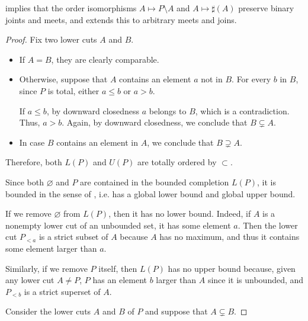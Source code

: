 \begin{comments}
  \item {} implies that the order isomorphisms \( A \mapsto P \setminus A \) and \( A \mapsto \sharp(A) \) preserve binary joints and meets, and  extends this to arbitrary meets and joins.
\end{comments}
\begin{proof}
   Fix two lower cuts \( A \) and \( B \).

  \begin{itemize}
    \item If \( A = B \), they are clearly comparable.
    \item Otherwise, suppose that \( A \) contains an element \( a \) not in \( B \). For every \( b \) in \( B \), since \( P \) is total, either \( a \leq b \) or \( a > b \).

    If \( a \leq b \), by downward closedness \( a \) belongs to \( B \), which is a contradiction. Thus, \( a > b \). Again, by downward closedness, we conclude that \( B \subsetneq A \).

    \item In case \( B \) contains an element in \( A \), we conclude that \( B \supsetneq A \).
  \end{itemize}

  Therefore, both \( L(P) \) and \( U(P) \) are totally ordered by \( {\subset} \).

   Since both \( \varnothing \) and \( P \) are contained in the bounded completion \( L(P) \), it is bounded in the sense of , i.e. has a global lower bound and global upper bound.

  If we remove \( \varnothing \) from \( L(P) \), then it has no lower bound. Indeed, if \( A \) is a nonempty lower cut of an unbounded set, it has some element \( a \). Then the lower cut \( P_{<a} \) is a strict subset of \( A \) because \( A \) has no maximum, and thus it contains some element larger than \( a \).

  Similarly, if we remove \( P \) itself, then \( L(P) \) has no upper bound because, given any lower cut \( A \neq P \), \( P \) has an element \( b \) larger than \( A \) since it is unbounded, and \( P_{<b} \) is a strict superset of \( A \).

   Consider the lower cuts \( A \) and \( B \) of \( P \) and suppose that \( A \subsetneq B \).


\end{proof}
